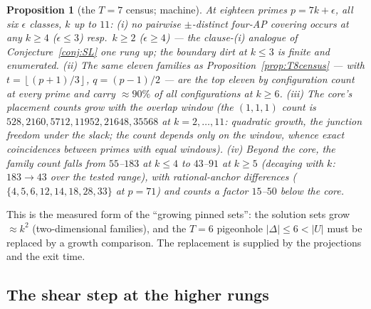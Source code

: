 \documentclass[11pt,a4paper]{article}
\numberwithin{equation}{section}
\theoremstyle{plain}
\newtheorem{proposition}[theorem]{Proposition}
\theoremstyle{definition}
\theoremstyle{remark}
\newcommand{\floor}[1]{\left\lfloor #1 \right\rfloor}
\begin{document}
\begin{proposition}[the $T=7$ census; machine]\label{prop:T7census}
At eighteen primes $p=7k+\epsilon$, all six $\epsilon$ classes, $k$ up
to $11$: (i) \emph{no pairwise $\pm$-distinct four-AP covering occurs}
at any $k\ge4$ ($\epsilon\le3$) resp.\ $k\ge2$ ($\epsilon\ge4$) --- the
clause-(i) analogue of Conjecture~\ref{conj:SL} one rung up; the
boundary dirt at $k\le3$ is finite and enumerated. (ii) The same eleven
families as Proposition~\ref{prop:T8census} --- with
$t=\floor{(p+1)/3}$, $q=(p-1)/2$ --- are the top eleven by
configuration count at every prime and carry $\approx90\%$ of all
configurations at $k\ge6$. (iii) The core's placement counts grow with
the overlap window (the $(1,1,1)$ count is
$528,2160,5712,11952,21648,35568$ at $k=2,\dots,11$: quadratic growth,
the junction freedom under the slack; the count depends only on the
window, whence exact coincidences between primes with equal windows).
(iv) Beyond the core, the family count falls from $55$--$183$ at
$k\le4$ to $43$--$91$ at $k\ge5$ (decaying with $k$: $183\to43$ over
the tested range), with rational-anchor differences
($\{4,5,6,12,14,18,28,33\}$ at $p=71$) and counts a factor $15$--$50$
below the core.
\end{proposition}

This is the measured form of the ``growing pinned sets'': the solution
sets grow $\approx k^2$ (two-dimensional families), and the $T=6$
pigeonhole $|\Delta|\le6<|U|$ must be replaced by a growth comparison.
The replacement is supplied by the projections and the exit time.

\subsection{The shear step at the higher rungs}
\end{document}
